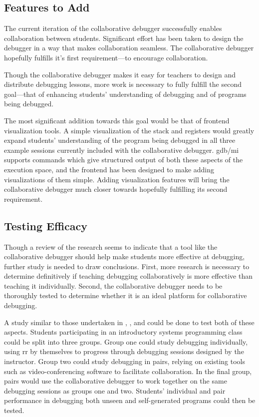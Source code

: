 \documentclass[12pt]{article}
\begin{document}
\subsection{Features to Add}

The current iteration of the collaborative debugger successfully
enables collaboration between students.  Significant effort has been
taken to design the debugger in a way that makes collaboration
seamless.  The collaborative debugger hopefully fulfills it's first
requirement---to encourage collaboration.
\par

Though the collaborative debugger makes it easy for teachers to design
and distribute debugging lessons, more work is necessary to fully
fulfill the second goal---that of enhancing students' understanding of
debugging and of programs being debugged.
\par

The most significant addition towards this goal would be that of
frontend visualization tools.  A simple visualization of the stack and
registers would greatly expand students' understanding of the program
being debugged in all three example sessions currently included with
the collaborative debugger.  gdb/mi supports commands which give
structured output of both these aspects of the execution space, and
the frontend has been designed to make adding visualizations of them
simple.  Adding visualization features will bring the collaborative
debugger much closer towards hopefully fulfilling its second
requirement.

\subsection{Testing Efficacy}

Though a review of the research seems to indicate that a tool like the
collaborative debugger should help make students more effective at
debugging, further study is needed to draw conclusions.  First, more
research is necessary to determine definitively if teaching debugging
collaboratively is more effective than teaching it individually.
Second, the collaborative debugger needs to be thoroughly tested to
determine whether it is an ideal platform for collaborative debugging.
\par

A study similar to those undertaken in \cite{10.1145/1026487.1008043},
\cite{10.1145/1145287.1145293}, and \cite{10.1145/3361721.3361724}
could be done to test both of these aspects.  Students participating
in an introductory systems programming class could be split into three
groups.  Group one could study debugging individually, using rr by
themselves to progress through debugging sessions designed by the
instructor.  Group two could study debugging in pairs, relying on
existing tools such as video-conferencing software to facilitate
collaboration.  In the final group, pairs would use the collaborative
debugger to work together on the same debugging sessions as groups one
and two.  Students' individual and pair performance in debugging both
unseen and self-generated programs could then be tested.
\end{document}
